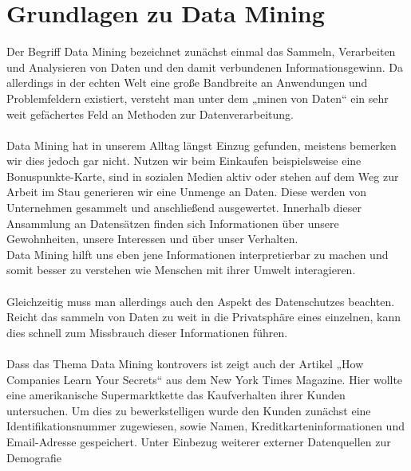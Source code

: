 %


%
%
\chapter{Grundlagen zu Data Mining}
\label{sec:intro}


Der Begriff Data Mining bezeichnet zunächst einmal das Sammeln, Verarbeiten und
Analysieren von Daten und den damit verbundenen Informationsgewinn. Da
allerdings in der echten Welt eine große Bandbreite an Anwendungen und
Problemfeldern existiert, versteht man unter dem „minen von Daten“ ein sehr
weit gefächertes Feld an Methoden zur Datenverarbeitung. \\
\\
Data Mining hat in unserem Alltag längst Einzug gefunden, meistens bemerken wir
dies jedoch gar nicht. Nutzen wir beim Einkaufen beispielsweise eine
Bonuspunkte-Karte, sind in sozialen Medien aktiv oder stehen auf dem Weg zur
Arbeit im Stau generieren wir eine Unmenge an Daten. Diese werden von
Unternehmen gesammelt und anschließend ausgewertet. Innerhalb dieser Ansammlung
an Datensätzen finden sich Informationen über unsere Gewohnheiten, unsere
Interessen und über unser Verhalten. \\
Data Mining hilft uns eben jene Informationen interpretierbar zu machen und
somit besser zu verstehen wie Menschen mit ihrer Umwelt interagieren. \\
\\
Gleichzeitig muss man allerdings auch den Aspekt des Datenschutzes beachten.
Reicht das sammeln von Daten zu weit in die Privatsphäre eines einzelnen,
kann dies schnell zum Missbrauch dieser Informationen führen. \\
\\
Dass das Thema Data Mining kontrovers ist zeigt auch der Artikel „How
Companies Learn Your Secrets“ aus dem New York Times Magazine. Hier wollte
eine amerikanische Supermarktkette das Kaufverhalten ihrer Kunden untersuchen.
Um dies zu bewerkstelligen wurde den Kunden zunächst eine Identifikationsnummer
zugewiesen, sowie Namen, Kreditkarteninformationen und Email-Adresse
gespeichert. Unter Einbezug weiterer externer Datenquellen zur Demografie
